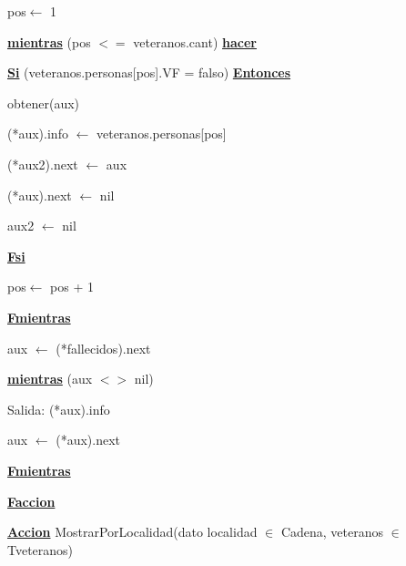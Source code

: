 \documentclass{article}
\begin{document}
            \hspace{12mm}pos$\leftarrow$ 1

            \hspace{12mm}\underline{\textbf{mientras}} (pos $<=$ veteranos.cant) \underline{\textbf{hacer}}

                \hspace{16mm}\underline{\textbf{Si}} (veteranos.personas[pos].VF = falso) \underline{\textbf{Entonces}}

                    \hspace{20mm}obtener(aux)

                    \hspace{20mm}(*aux).info $\leftarrow$ veteranos.personas[pos]

                    \hspace{20mm}(*aux2).next $\leftarrow$ aux

                    \hspace{20mm}(*aux).next $\leftarrow$ nil

                    \hspace{20mm}aux2 $\leftarrow$ nil

                \hspace{16mm}\underline{\textbf{Fsi}}

                \hspace{16mm}pos$\leftarrow$ pos + 1

            \hspace{12mm}\underline{\textbf{Fmientras}}

            \hspace{12mm}aux $\leftarrow$ (*fallecidos).next

            \hspace{12mm}\underline{\textbf{mientras}} (aux $<>$ nil)

                \hspace{16mm}Salida: (*aux).info

                \hspace{16mm}aux $\leftarrow$ (*aux).next

            \hspace{12mm}\underline{\textbf{Fmientras}}

    \hspace{4mm}\underline{\textbf{Faccion}}

    \vspace{4mm}

    \hspace{4mm}\underline{\textbf{Accion}} MostrarPorLocalidad(dato localidad $\in$ Cadena, veteranos $\in$ Tveteranos)
\end{document}
